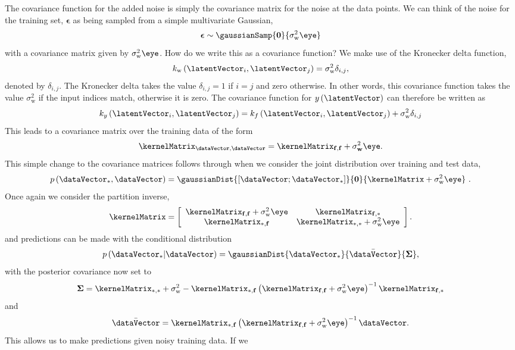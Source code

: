 The covariance function for the added noise is simply the covariance
matrix for the noise at the data points. We can think of the noise for
the training set, $\boldsymbol{\epsilon}$ as being sampled from a
simple multivariate Gaussian,
\[
\boldsymbol{\epsilon} \sim \gaussianSamp{\mathbf{0}}{\sigma^2_{\mathrm{w}}\eye}
\]
with a covariance matrix given by $\sigma_\mathrm{w}^2\eye$. How do we
write this as a covariance function? We make use of the Kronecker
delta function,
\[
k_\mathrm{w}\left(\latentVector_i,\latentVector_j\right) =
\sigma^2_{\mathrm{w}}\delta_{i,j},
\]
denoted by $\delta_{i,j}$. The Kronecker delta takes the value
$\delta_{i,j}=1$ if $i=j$ and zero otherwise. In other words, this
covariance function takes the value $\sigma^2_{\mathrm{w}}$ if the
input indices match, otherwise it is zero. The covariance function for
$y\left(\latentVector\right)$ can therefore be written as
\[
k_y\left(\latentVector_i,\latentVector_j\right) = k_f\left(\latentVector_i,
  \latentVector_j\right) + \sigma^2_{\mathrm{w}}\delta_{i,j}
\]
This leads to a covariance matrix over the training data of the form
\[
\kernelMatrix_{\dataVector,\dataVector} = \kernelMatrix_{\mathbf{f},
  \mathbf{f}} + \sigma^2_\mathbf{w}\eye.
\]
This simple change to the covariance matrices follows through when we consider the joint distribution over training and test data,
\[
p\left(\dataVector_{*},\dataVector\right) = \gaussianDist{\left[\dataVector;
    \dataVector_{*}\right]}{\mathbf{0}}{\kernelMatrix+\sigma_\mathrm{w}^2\eye
} \ .
\]
Once again we consider the partition inverse,
\[
\kernelMatrix=\left[\begin{array}{cc}
    \kernelMatrix_{\mathbf{f},\mathbf{f}} +\sigma_\mathrm{w}^2 \eye& \kernelMatrix_{\mathbf{f},*}\\
    \kernelMatrix_{*,\mathbf{f}} &
    \kernelMatrix_{\mathbf{*,*}}+\sigma_{\mathrm{w}}^2
    \eye\end{array}\right].
\] 
and predictions can be made with the conditional distribution
\[
p\left(\dataVector_{*}|\dataVector\right)=\gaussianDist{\dataVector_{*}}{
\bar{\dataVector}}{\boldsymbol{\Sigma}},
\] 
with the posterior covariance now set to 
\[
\boldsymbol{\Sigma}=\kernelMatrix_{*,*} + \sigma_{\mathrm{w}}^2 -
\kernelMatrix_{*,\mathbf{f}}\left(\kernelMatrix_{\mathbf{f},\mathbf{f}} +
  \sigma_{\mathrm{w}}^2\eye\right)^{-1} \kernelMatrix_{\mathbf{f},*}
\]
and
\[
\bar{\dataVector}=\kernelMatrix_{*,\mathbf{f}}
\left(\kernelMatrix_{\mathbf{f},\mathbf{f}} +
  \sigma_{\mathrm{w}}^2\eye\right)^{-1}\dataVector.
\]
This allows us to make predictions given noisy training data. If we
